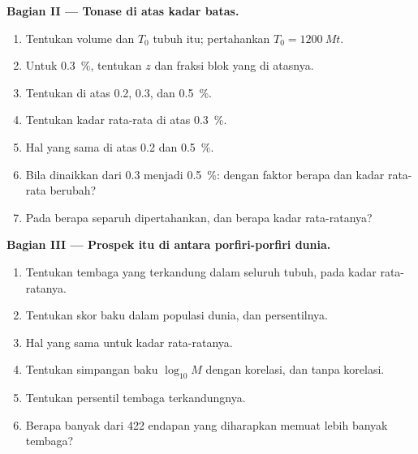 \begin{problem}
\noindent\textbf{Bagian II --- Tonase di atas kadar batas.}
\begin{enumerate}[resume]
  \item Tentukan volume dan  $T_0$ tubuh itu; pertahankan $T_0 = \qty{1200}{Mt}$.
  \item Untuk  \qty{0.3}{\percent}, tentukan $z$ dan fraksi blok yang di atasnya.
  \item Tentukan  di atas  0.2, 0.3, dan \qty{0.5}{\percent}.
  \item Tentukan kadar rata-rata di atas  \qty{0.3}{\percent}.
  \item Hal yang sama di atas 0.2 dan \qty{0.5}{\percent}.
  \item Bila  dinaikkan dari 0.3 menjadi \qty{0.5}{\percent}: dengan faktor berapa  dan
        kadar rata-rata berubah?
  \item Pada  berapa separuh  dipertahankan, dan berapa kadar rata-ratanya?
\end{enumerate}

\noindent\textbf{Bagian III --- Prospek itu di antara porfiri-porfiri dunia.}
\begin{enumerate}[resume]
  \item Tentukan tembaga yang terkandung dalam seluruh tubuh, pada kadar rata-ratanya.
  \item Tentukan skor baku  dalam populasi dunia, dan persentilnya.
  \item Hal yang sama untuk kadar rata-ratanya.
  \item Tentukan simpangan baku $\log_{10} M$ dengan korelasi, dan tanpa korelasi.
  \item Tentukan persentil tembaga terkandungnya.
  \item Berapa banyak dari 422 endapan yang diharapkan memuat lebih banyak tembaga?
\end{enumerate}


\end{problem}

